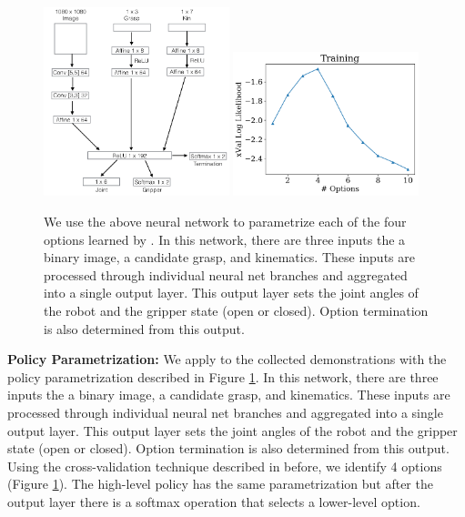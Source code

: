 \begin{figure} [ht!]
    \includegraphics[width=0.48\textwidth]{ddco-experiments/net.png}
    \includegraphics[width=0.48\textwidth]{ddco-experiments/exp6-1.png}
    \caption{We use the above neural network to parametrize each of the four options learned by \alg. In this network, there are three inputs the a binary image, a candidate grasp, and kinematics. These inputs are processed through individual neural net branches and aggregated into a single output layer. This output layer sets the joint angles of the robot and the gripper state (open or closed). Option termination is also determined from this output. \label{fig:dvrknet}}
\end{figure}

\vspace{0.25em} \noindent \textbf{Policy Parametrization: } We apply \alg to the collected demonstrations with the policy parametrization described in Figure \ref{fig:dvrknet}. In this network, there are three inputs the a binary image, a candidate grasp, and kinematics. These inputs are processed through individual neural net branches and aggregated into a single output layer. This output layer sets the joint angles of the robot and the gripper state (open or closed). Option termination is also determined from this output. Using the cross-validation technique described in before, we identify 4 options (Figure \ref{fig:dvrknet}). The high-level policy has the same parametrization but after the output layer there is a softmax operation that selects a lower-level option.  

